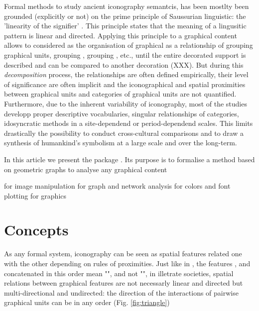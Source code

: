 \documentclass[article]{jss}
\begin{document}
Formal methods to study ancient iconography semantcis, has been mostlty been grounded (explicitly or not) on the prime principle of Saussurian linguistic: the 'linearity of the signifier' \citep{Saussure89}. This principle states that the meaning of a lingusitic pattern is linear and directed. Applying this principle to a graphical content allows to considered as the organisation of graphical as a relationship of  grouping graphical units,  grouping ,  grouping , etc., until the entire decorated support is described and can be compared to another decoration (XXX). But during this \emph{decomposition} process, the relationships are often defined empirically, their level of significance are often implicit and the iconographical and spatial proximities between graphical units and categories of graphical units are not quantified. Furthermore, due to the inherent variability of iconography, most of the studies developp proper descriptive vocabularies, singular relationships of categories, idosyncratic methods in a site-dependend or period-dependend scales. This limits drastically the possibility to conduct cross-cultural comparisons and to draw a synthesis of humankind's symbolism at a large scale and over the long-term. 

In this article we present the  package . Its purpose is to formalise a method based on geometric graphs to analyse any graphical content  

 for image manipulation \citep{Ooms18}
 \citep{Csardi06} for graph and network analysis
 for colors and font plotting \citep{R19}
 for graphics \citep{R19}


\section[Concepts]{Concepts} \label{sec:concepts}

As any formal system, iconography can be seen as spatial features related one with the other depending on rules of proximities. Just like in , the features ,  and  concatenated in this order mean "", and not "", in illetrate societies, spatial relations between graphical features are not necessarly linear and directed but multi-directional and undirected: the direction of the interactions of pairwise graphical units can be in any order (Fig. \ref{fig:triangle})
\end{document}
